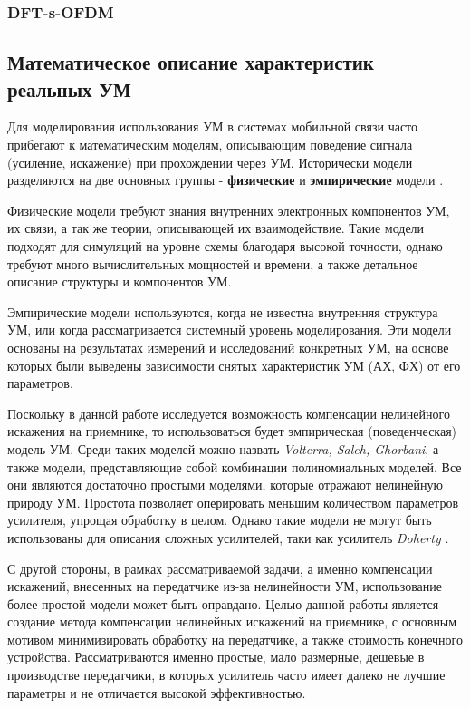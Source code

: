 \subsubsection{DFT-s-OFDM}



\subsection{Математическое описание характеристик реальных УМ}

Для моделирования использования УМ в системах мобильной связи часто прибегают к
математическим моделям, описывающим поведение сигнала (усиление, искажение) при 
прохождении через УМ. Исторически модели разделяются на две основных
группы - \textbf{физические} и \textbf{эмпирические} модели \cite{cambridge2008}.

Физические модели требуют знания внутренних электронных компонентов УМ, их
связи, а так же теории, описывающей их взаимодействие. Такие модели подходят
для симуляций на уровне схемы благодаря высокой точности, однако требуют
много вычислительных мощностей и времени, а также детальное описание
структуры и компонентов УМ.

Эмпирические модели используются, когда не известна внутренняя структура УМ,
или когда рассматривается системный уровень моделирования. Эти модели
основаны на результатах измерений и исследований конкретных УМ, на основе
которых были выведены зависимости снятых характеристик УМ (АХ, ФХ) от его
параметров.

Поскольку в данной работе исследуется возможность компенсации нелинейного
искажения на приемнике, то использоваться будет эмпирическая
(поведенческая) модель УМ. Среди таких моделей можно назвать
\textit{Volterra, Saleh, Ghorbani}, а также модели, представляющие собой комбинации
полиномиальных моделей. Все они являются достаточно простыми моделями,
которые отражают нелинейную природу УМ. Простота позволяет оперировать
меньшим количеством параметров усилителя, упрощая обработку в целом. Однако
такие модели не могут быть использованы для описания сложных усилителей,
таки как усилитель \textit{Doherty} \cite{Doherty1936}\cite{3gpp.38.803}.

С другой стороны, в рамках рассматриваемой задачи, а именно компенсации
искажений, внесенных на передатчике из-за нелинейности УМ, использование
более простой модели может быть оправдано. Целью данной работы является
создание метода компенсации нелинейных искажений на приемнике, с основным
мотивом минимизировать обработку на передатчике, а также стоимость
конечного устройства. Рассматриваются именно простые, мало размерные,
дешевые в производстве передатчики, в которых усилитель часто имеет далеко
не лучшие параметры и не отличается высокой эффективностью.

